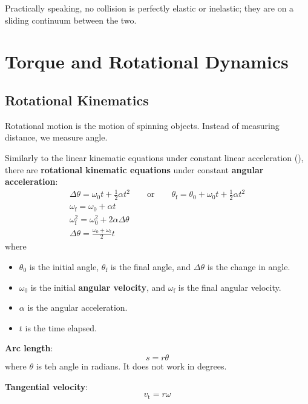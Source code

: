 \documentclass[a4paper, titlepage]{book}
\begin{document}
Practically speaking, no collision is perfectly elastic or inelastic;
they are on a sliding continuum between the two.


\chapter{Torque and Rotational Dynamics}

\section{Rotational Kinematics}

Rotational motion is the motion of spinning objects.
Instead of measuring distance, we measure angle.

Similarly to the linear kinematic equations
under constant linear acceleration (),
there are \textbf{rotational kinematic equations}
under constant \textbf{angular acceleration}:
\begin{gather}
    {
        \Delta{\theta} = \omega_0 t + \frac{1}{2} \alpha t^2
        \qquad \mathrm{or} \qquad
        \theta_\mathrm{f} = \theta_0 + \omega_0 t + \frac{1}{2} \alpha t^2
    } \\
    \omega_\mathrm{f} = \omega_0 + \alpha t \\
    \omega_\mathrm{f}^2 = \omega_0^2 + 2 \alpha \Delta{\theta} \\
    \Delta{\theta} = \frac{\omega_0 + \omega_\mathrm{f}}{2} t
\end{gather}
where
\begin{itemize}
    \item
        \(\theta_0\) is the initial angle,
        \(\theta_\mathrm{f}\) is the final angle,
        and \(\Delta{\theta}\) is the change in angle.
    \item 
        \(\omega_0\) is the initial \textbf{angular velocity},
        and \(\omega_\mathrm{f}\) is the final angular velocity.
    \item \(\alpha\) is the angular acceleration.
    \item \(t\) is the time elapsed.
\end{itemize}

\textbf{Arc length}:
\begin{equation}
    s = r \theta
\end{equation}
where \(\theta\) is teh angle in radians.
It does not work in degrees.

\textbf{Tangential velocity}:
\begin{equation}
    v_\mathrm{t} = r \omega
\end{equation}
\end{document}

